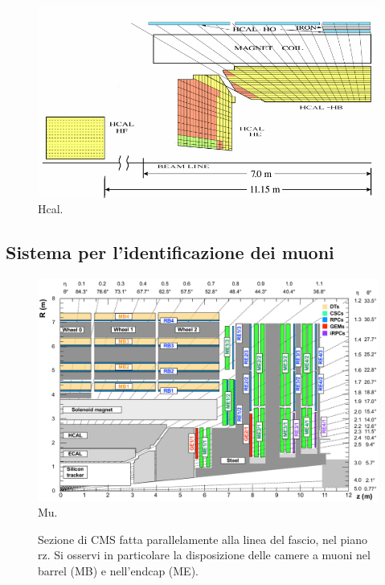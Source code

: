 \begin{figure}[!htb]
  \centering
    \includegraphics[width=.7\textwidth]{figures/cmshcal.png}
  \caption{Hcal.}
  \label{fig:CMS_hcal}
\end{figure}

\subsection{Sistema per l'identificazione dei muoni}

\begin{figure}[!htb]
  \centering
    \includegraphics[width=.9\textwidth]{figures/cmsmuon.png}
  \caption{Mu.}
  \label{fig:CMS_muon}
\end{figure}

\begin{figure}%
\centering
\caption{Sezione di CMS fatta parallelamente alla linea del fascio, nel piano $\mathrm{rz}$. Si osservi in particolare la disposizione delle camere a muoni nel barrel (MB) e nell'endcap (ME).}
\label{fig:camere_muoni}
\end{figure}

